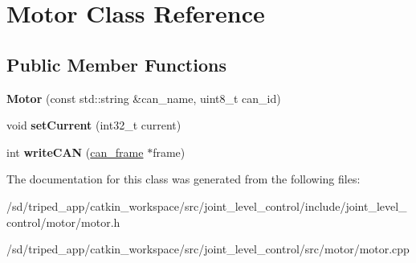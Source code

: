 \hypertarget{classMotor}{}\section{Motor Class Reference}
\label{classMotor}
\subsection*{Public Member Functions}
\begin{DoxyCompactItemize}
\item 
\mbox{\label{classMotor_a00bdaca43863fd9de6b48f5cf53bbfc3}} 
{\bfseries Motor} (const std\+::string \&can\+\_\+name, uint8\+\_\+t can\+\_\+id)
\item 
\mbox{\label{classMotor_a7cb17a0f6e8aad3523348a1687bf549b}} 
void {\bfseries set\+Current} (int32\+\_\+t current)
\item 
\mbox{\label{classMotor_a77185f4c17591bed876cbb3e5d8735f1}} 
int {\bfseries write\+C\+AN} (\hyperlink{structcan__frame}{can\+\_\+frame} $\ast$frame)
\end{DoxyCompactItemize}


The documentation for this class was generated from the following files\+:\begin{DoxyCompactItemize}
\item 
/sd/triped\+\_\+app/catkin\+\_\+workspace/src/joint\+\_\+level\+\_\+control/include/joint\+\_\+level\+\_\+control/motor/motor.\+h\item 
/sd/triped\+\_\+app/catkin\+\_\+workspace/src/joint\+\_\+level\+\_\+control/src/motor/motor.\+cpp\end{DoxyCompactItemize}
